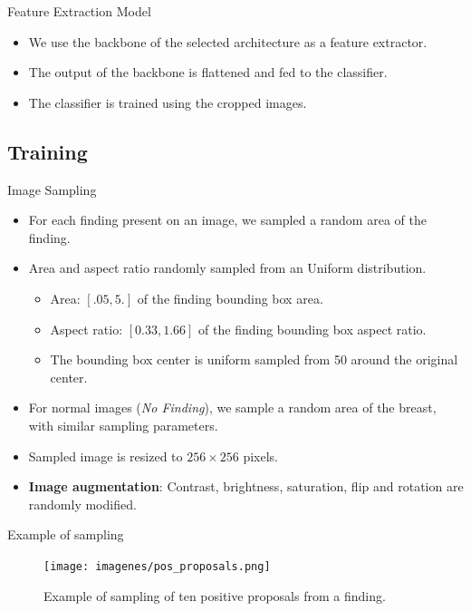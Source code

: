 \begin{frame}{Feature Extraction Model}
    \begin{itemize}
        \item We use the backbone of the selected architecture as a feature extractor.
        \item The output of the backbone is flattened and fed to the classifier.
        \item The classifier is trained using the cropped images.
    \end{itemize}
\end{frame}

\subsection{Training}
\begin{frame}{Image Sampling}
    \begin{itemize}
        \item For each finding present on an image, we sampled a random area of the finding.
        \item Area and aspect ratio randomly sampled from an Uniform distribution.
        \begin{itemize}
            \item Area: $[.05, 5.]$ of the finding bounding box area.
            \item Aspect ratio: $[0.33, 1.66]$ of the finding bounding box aspect ratio.
            \item The bounding box center is uniform sampled from \SI{50}{\pixel} around the original center.
        \end{itemize}
        \item For normal images (\emph{No Finding}), we sample a random area of the breast, with similar sampling parameters.
        \item Sampled image is resized to $256 \times 256$ pixels.
        \item \textbf{Image augmentation}: Contrast, brightness, saturation, flip and rotation are randomly modified.
    \end{itemize}
\end{frame}

\begin{frame}{Example of sampling}
    \begin{figure}
        \centering
        \texttt{[image: imagenes/pos\_proposals.png]}
        \caption{Example of sampling of ten positive proposals from a finding.}
    \end{figure}
\end{frame}

